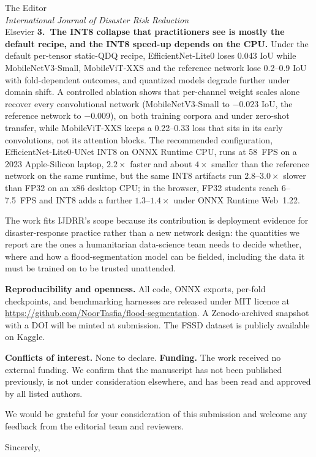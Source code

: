 \documentclass[11pt]{letter}
\begin{document}
\begin{letter}{The Editor\\\emph{International Journal of Disaster Risk Reduction}\\Elsevier}
\textbf{3.~The INT8 collapse that practitioners see is mostly the default recipe, and the INT8 speed-up depends on the CPU.} Under the default per-tensor static-QDQ recipe, EfficientNet-Lite0 loses 0.043 IoU while MobileNetV3-Small, MobileViT-XXS and the reference network lose 0.2--0.9 IoU with fold-dependent outcomes, and quantized models degrade further under domain shift. A controlled ablation shows that per-channel weight scales alone recover every convolutional network (MobileNetV3-Small to $-0.023$ IoU, the reference network to $-0.009$), on both training corpora and under zero-shot transfer, while MobileViT-XXS keeps a 0.22--0.33 loss that sits in its early convolutions, not its attention blocks. The recommended configuration, EfficientNet-Lite0-UNet INT8 on ONNX Runtime CPU, runs at 58~FPS on a 2023 Apple-Silicon laptop, $2.2\times$ faster and about $4\times$ smaller than the reference network on the same runtime, but the same INT8 artifacts run $2.8$--$3.0\times$ slower than FP32 on an x86 desktop CPU; in the browser, FP32 students reach 6--7.5~FPS and INT8 adds a further $1.3$--$1.4\times$ under ONNX Runtime Web~1.22.

The work fits IJDRR's scope because its contribution is deployment evidence for disaster-response practice rather than a new network design: the quantities we report are the ones a humanitarian data-science team needs to decide whether, where and how a flood-segmentation model can be fielded, including the data it must be trained on to be trusted unattended.

\textbf{Reproducibility and openness.} All code, ONNX exports, per-fold checkpoints, and benchmarking harnesses are released under MIT licence at \url{https://github.com/NoorTasfia/flood-segmentation}. A Zenodo-archived snapshot with a DOI will be minted at submission. The FSSD dataset is publicly available on Kaggle.

\textbf{Conflicts of interest.} None to declare. \textbf{Funding.} The work received no external funding. We confirm that the manuscript has not been published previously, is not under consideration elsewhere, and has been read and approved by all listed authors.

We would be grateful for your consideration of this submission and welcome any feedback from the editorial team and reviewers.

\closing{Sincerely,}

\end{letter}
\end{document}
